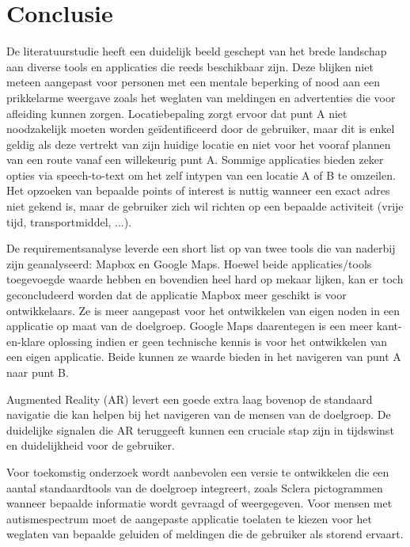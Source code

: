 
\chapter{Conclusie}%
\label{ch:conclusie}



De literatuurstudie heeft een duidelijk beeld geschept van het brede landschap aan diverse tools en applicaties die reeds beschikbaar zijn. Deze blijken niet meteen aangepast voor personen met een mentale beperking of nood aan een prikkelarme weergave zoals het weglaten van meldingen en advertenties die voor afleiding kunnen zorgen. Locatiebepaling zorgt ervoor dat punt A niet noodzakelijk moeten worden geïdentificeerd door de gebruiker, maar dit is enkel geldig als deze vertrekt van zijn huidige locatie en niet voor het vooraf plannen van een route vanaf een willekeurig punt A. Sommige applicaties bieden zeker opties via speech-to-text om het zelf intypen van een locatie A of B te omzeilen. Het opzoeken van bepaalde points of interest is nuttig wanneer een exact adres niet gekend is, maar de gebruiker zich wil richten op een bepaalde activiteit (vrije tijd, transportmiddel, ...).  

De requirementsanalyse leverde een short list op van twee tools die van naderbij zijn geanalyseerd: Mapbox en Google Maps. Hoewel beide applicaties/tools toegevoegde waarde hebben en bovendien heel hard op mekaar lijken, kan er toch geconcludeerd worden dat de applicatie Mapbox meer geschikt is voor ontwikkelaars. Ze is meer aangepast voor het ontwikkelen van eigen noden in een applicatie op maat van de doelgroep. Google Maps daarentegen is een meer kant-en-klare oplossing indien er geen technische kennis is voor het ontwikkelen van een eigen applicatie. Beide kunnen ze waarde bieden in het navigeren van punt A naar punt B.

Augmented Reality (AR) levert een goede extra laag bovenop de standaard navigatie die kan helpen bij het navigeren van de mensen van de doelgroep. De duidelijke signalen die AR teruggeeft kunnen een cruciale stap zijn in tijdswinst en duidelijkheid voor de gebruiker.

Voor toekomstig onderzoek wordt aanbevolen een versie te ontwikkelen die een aantal standaardtools van de doelgroep integreert, zoals Sclera pictogrammen wanneer bepaalde informatie wordt gevraagd of weergegeven. Voor mensen met autismespectrum moet de aangepaste applicatie toelaten te kiezen voor het weglaten van bepaalde geluiden of meldingen die de gebruiker als storend ervaart. 